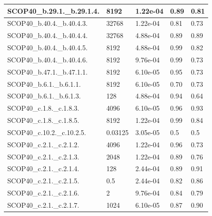 \documentclass[11pt]{article}
\begin{document}
\begin{longtable}{|p{}|p{}|p{}|p{}|p{}|}
	SCOP40\_b.29.1.\_b.29.1.4.    & 8192    & 1.22e-04   & 0.89  & 0.81 \\ \hline
	
	SCOP40\_b.40.4.\_b.40.4.3.    & 32768   & 1.22e-04   & 0.81  & 0.73 \\ \hline
	
	SCOP40\_b.40.4.\_b.40.4.4.    & 32768   & 4.88e-04  & 0.89  & 0.89 \\ \hline
	
	SCOP40\_b.40.4.\_b.40.4.5.    & 8192    & 4.88e-04  & 0.99  & 0.82 \\ \hline
	
	SCOP40\_b.40.4.\_b.40.4.6.    & 8192    & 9.76e-04  & 0.99  & 0.73 \\ \hline
	
	SCOP40\_b.47.1.\_b.47.1.1.    & 8192    & 6.10e-05  & 0.95  & 0.73 \\ \hline
	
	SCOP40\_b.6.1.\_b.6.1.1.      & 8192    & 6.10e-05  & 0.70  & 0.73 \\ \hline
	
	SCOP40\_b.6.1.\_b.6.1.3.      & 128     & 4.88e-04  & 0.94  & 0.64 \\ \hline
	
	SCOP40\_c.1.8.\_c.1.8.3.      & 4096    & 6.10e-05  & 0.96  & 0.93 \\ \hline
	
	SCOP40\_c.1.8.\_c.1.8.5.      & 8192    & 1.22e-04  & 0.99  & 0.84 \\ \hline
	
	SCOP40\_c.10.2.\_c.10.2.5.    & 0.03125 & 3.05e-05  & 0.5   & 0.5  \\ \hline
	
	SCOP40\_c.2.1.\_c.2.1.2.      & 4096    & 1.22e-04  & 0.96  & 0.73 \\ \hline
	
	SCOP40\_c.2.1.\_c.2.1.3.      & 2048    & 1.22e-04  & 0.89  & 0.76 \\ \hline
	
	SCOP40\_c.2.1.\_c.2.1.4.      & 128     & 2.44e-04  & 0.89  & 0.91 \\ \hline
	
	SCOP40\_c.2.1.\_c.2.1.5.      & 0.5     & 2.44e-04  & 0.82  & 0.86 \\ \hline
	
	SCOP40\_c.2.1.\_c.2.1.6.      & 2       & 9.76e-04  & 0.84  & 0.79 \\ \hline
	
	SCOP40\_c.2.1.\_c.2.1.7.      & 1024    & 6.10e-05  & 0.87  & 0.90 \\ \hline
	

\end{longtable}
\end{document}
